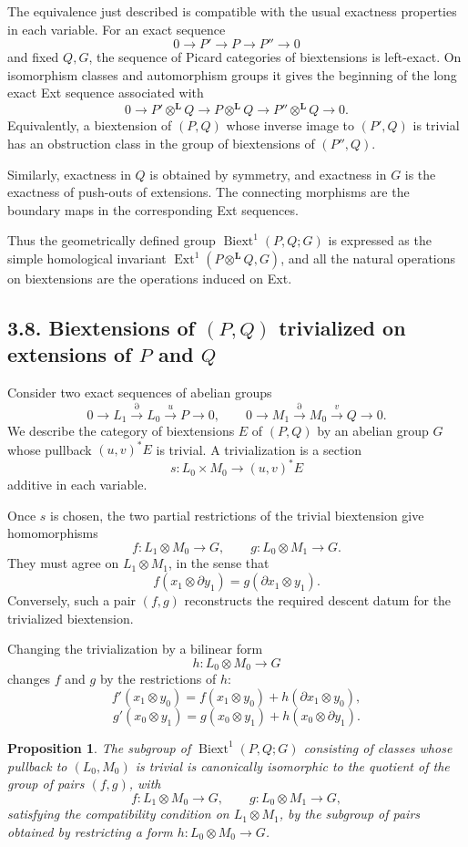 \documentclass[11pt]{article}
\theoremstyle{plain}
\newtheorem{proposition}[theorem]{Proposition}
\theoremstyle{definition}
\theoremstyle{remark}
\DeclareMathOperator{\Ext}{Ext}
\DeclareMathOperator{\Biext}{Biext}
\newcommand{\bL}{\mathbf L}
\begin{document}
The equivalence just described is compatible with the usual exactness properties
in each variable. For an exact sequence
\[
0\to P'\to P\to P''\to 0
\]
and fixed \(Q,G\), the sequence of Picard categories of biextensions is
left-exact. On isomorphism classes and automorphism groups it gives the beginning
of the long exact Ext sequence associated with
\[
0\to P'\otimes^{\bL}Q\to P\otimes^{\bL}Q\to
P''\otimes^{\bL}Q\to 0.
\]
Equivalently, a biextension of \((P,Q)\) whose inverse image to \((P',Q)\) is
trivial has an obstruction class in the group of biextensions of
\((P'',Q)\).

Similarly, exactness in \(Q\) is obtained by symmetry, and exactness in \(G\) is
the exactness of push-outs of extensions. The connecting morphisms are the
boundary maps in the corresponding Ext sequences.

Thus the geometrically defined group \(\Biext^1(P,Q;G)\) is expressed as the
simple homological invariant \(\Ext^1(P\otimes^{\bL}Q,G)\), and all the natural
operations on biextensions are the operations induced on Ext.

\subsection*{3.8. Biextensions of \((P,Q)\) trivialized on extensions of \(P\) and \(Q\)}

Consider two exact sequences of abelian groups
\[
0\to L_1\xrightarrow{\partial} L_0\xrightarrow{u}P\to 0,\qquad
0\to M_1\xrightarrow{\partial} M_0\xrightarrow{v}Q\to 0.
\]
We describe the category of biextensions \(E\) of \((P,Q)\) by an abelian group
\(G\) whose pullback \((u,v)^*E\) is trivial. A trivialization is a section
\[
s:L_0\times M_0\longrightarrow (u,v)^*E
\]
additive in each variable.

Once \(s\) is chosen, the two partial restrictions of the trivial biextension
give homomorphisms
\[
f:L_1\otimes M_0\to G,\qquad
g:L_0\otimes M_1\to G.
\]
They must agree on \(L_1\otimes M_1\), in the sense that
\[
f(x_1\otimes \partial y_1)=g(\partial x_1\otimes y_1).
\]
Conversely, such a pair \((f,g)\) reconstructs the required descent datum for the
trivialized biextension.

Changing the trivialization by a bilinear form
\[
h:L_0\otimes M_0\to G
\]
changes \(f\) and \(g\) by the restrictions of \(h\):
\[
f'(x_1\otimes y_0)=f(x_1\otimes y_0)+h(\partial x_1\otimes y_0),
\]
\[
g'(x_0\otimes y_1)=g(x_0\otimes y_1)+h(x_0\otimes \partial y_1).
\]

\begin{proposition}
The subgroup of \(\Biext^1(P,Q;G)\) consisting of classes whose pullback to
\((L_0,M_0)\) is trivial is canonically isomorphic to the quotient of the group
of pairs \((f,g)\), with
\[
f:L_1\otimes M_0\to G,\qquad g:L_0\otimes M_1\to G,
\]
satisfying the compatibility condition on \(L_1\otimes M_1\), by the subgroup of
pairs obtained by restricting a form \(h:L_0\otimes M_0\to G\).
\end{proposition}
\end{document}
